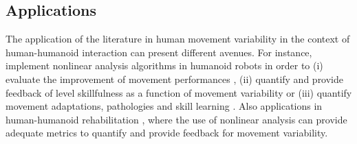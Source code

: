 \subsection*{Applications}
The application of the literature in human movement variability 
in the context of human-humanoid interaction can present different
avenues.
For instance, implement nonlinear analysis algorithms in humanoid robots 
in order to 
(i) evaluate the improvement of movement performances \citep{muller2004}, 
(ii) quantify and provide feedback of level skillfulness as a function 
of movement variability \citep{seifert2011} or 
(iii) quantify movement adaptations, pathologies and skill learning 
\citep{preatoni2007, preatoni2010, preatoni2013}.
Also applications in human-humanoid rehabilitation 
\citep{gorer2013, guneysu2015}, 
where the use of nonlinear analysis can provide adequate 
metrics to quantify and provide feedback for movement variability. 

